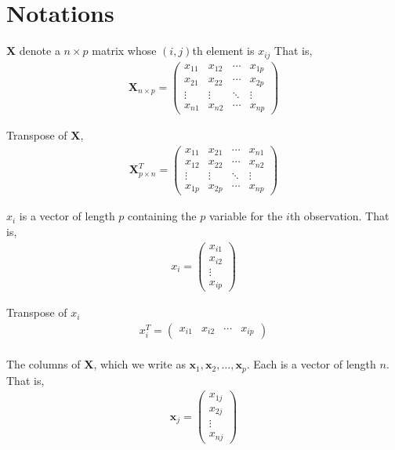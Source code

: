 \documentclass[12pt,a4paper]{article}%
\theoremstyle{definition}
\theoremstyle{plain}
\numberwithin{equation}{section}
\begin{document}
\section{Notations}

$\mathbf{X}$ denote a $n \times p$ matrix whose $(i,j)$th element is $x_{ij}$ That is,
\begin{gather}
\mathbf{X}_{n \times p} = \begin{pmatrix}
  x_{11} & x_{12} & \cdots & x_{1p}  \\
  x_{21} & x_{22} & \cdots & x_{2p}  \\
  \vdots & \vdots & \ddots & \vdots  \\
  x_{n1} & x_{n2} & \cdots & x_{np}
 \end{pmatrix}
\end{gather}

Transpose of $\mathbf{X}$,
\begin{gather}
\mathbf{X}^{T}_{p \times n} = \begin{pmatrix}
  x_{11} & x_{21} & \cdots & x_{n1}  \\
  x_{12} & x_{22} & \cdots & x_{n2}  \\
  \vdots & \vdots & \ddots & \vdots  \\
  x_{1p} & x_{2p} & \cdots & x_{np}
 \end{pmatrix}
\end{gather}

$x_{i}$ is a vector of length $p$ containing the $p$ variable for the $i$th observation. That is,
\begin{gather}
x_{i} = \begin{pmatrix}
  x_{i1} \\
  x_{i2} \\
  \vdots \\
  x_{ip} 
 \end{pmatrix}
\end{gather}

Transpose of $x_{i}$
\begin{gather}
x_{i}^{T} = \begin{pmatrix}
  x_{i1} & x_{i2} & \cdots & x_{ip}
 \end{pmatrix}
\end{gather}
~\\

The columns of $\mathbf{X}$, which we write as $\mathbf{x}_{1},\mathbf{x}_{2},\dots,\mathbf{x}_{p}$.
Each is a vector of length $n$. That is,
\begin{gather}
\mathbf{x}_{j} = \begin{pmatrix}
  x_{1j} \\
  x_{2j} \\
  \vdots \\
  x_{nj} 
 \end{pmatrix}
\end{gather}
\end{document}
